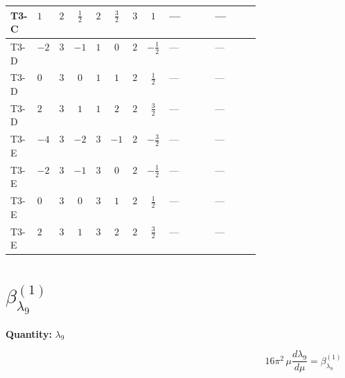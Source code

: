 \documentclass[8pt]{article}
\begin{document}
\begin{landscape}
\begin{longtable}{@{}llcccccc >{\raggedright\arraybackslash}p{0.21\linewidth} >{\raggedright\arraybackslash}p{0.21\linewidth}@{}}
\midrule
T3-C & $1$ & $2$ & $\frac{1}{2}$ & $2$ & $\frac{3}{2}$ & $3$ & $1$ & --- & --- \\
\midrule
T3-D & $-2$ & $3$ & $-1$ & $1$ & $0$ & $2$ & $-\frac{1}{2}$ & --- & --- \\
\midrule
T3-D & $0$ & $3$ & $0$ & $1$ & $1$ & $2$ & $\frac{1}{2}$ & --- & --- \\
\midrule
T3-D & $2$ & $3$ & $1$ & $1$ & $2$ & $2$ & $\frac{3}{2}$ & --- & --- \\
\midrule
T3-E & $-4$ & $3$ & $-2$ & $3$ & $-1$ & $2$ & $-\frac{3}{2}$ & --- & --- \\
\midrule
T3-E & $-2$ & $3$ & $-1$ & $3$ & $0$ & $2$ & $-\frac{1}{2}$ & --- & --- \\
\midrule
T3-E & $0$ & $3$ & $0$ & $3$ & $1$ & $2$ & $\frac{1}{2}$ & --- & --- \\
\midrule
T3-E & $2$ & $3$ & $1$ & $3$ & $2$ & $2$ & $\frac{3}{2}$ & --- & --- \\
\midrule
\bottomrule
\end{longtable}
\clearpage
\section*{$\beta_{\lambda_{9}}^{(1)}$}
\noindent\textbf{Quantity: }$\lambda_{9}$\par\smallskip
\[16\pi^2\,\mu\frac{d \lambda_{9}}{d\mu}=\beta_{\lambda_{9}}^{(1)}\]

\end{landscape}
\end{document}
